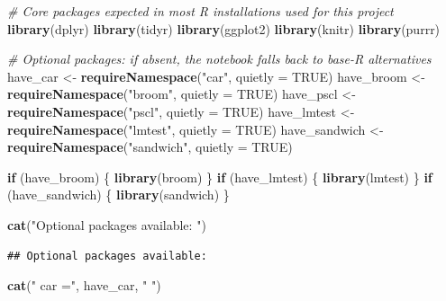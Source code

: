 \documentclass[
]{article}
\newenvironment{Shaded}{\begin{snugshade}}{\end{snugshade}}
\newcommand{\AttributeTok}[1]{\textcolor[rgb]{0.13,0.29,0.53}{#1}}
\newcommand{\CommentTok}[1]{\textcolor[rgb]{0.56,0.35,0.01}{\textit{#1}}}
\newcommand{\ConstantTok}[1]{\textcolor[rgb]{0.56,0.35,0.01}{#1}}
\newcommand{\ControlFlowTok}[1]{\textcolor[rgb]{0.13,0.29,0.53}{\textbf{#1}}}
\newcommand{\FunctionTok}[1]{\textcolor[rgb]{0.13,0.29,0.53}{\textbf{#1}}}
\newcommand{\NormalTok}[1]{#1}
\newcommand{\OtherTok}[1]{\textcolor[rgb]{0.56,0.35,0.01}{#1}}
\newcommand{\StringTok}[1]{\textcolor[rgb]{0.31,0.60,0.02}{#1}}
\begin{document}
\begin{Shaded}
\begin{Highlighting}[]
\CommentTok{\# Core packages expected in most R installations used for this project}
\FunctionTok{library}\NormalTok{(dplyr)}
\FunctionTok{library}\NormalTok{(tidyr)}
\FunctionTok{library}\NormalTok{(ggplot2)}
\FunctionTok{library}\NormalTok{(knitr)}
\FunctionTok{library}\NormalTok{(purrr)}

\CommentTok{\# Optional packages: if absent, the notebook falls back to base{-}R alternatives}
\NormalTok{have\_car      }\OtherTok{\textless{}{-}} \FunctionTok{requireNamespace}\NormalTok{(}\StringTok{"car"}\NormalTok{, }\AttributeTok{quietly =} \ConstantTok{TRUE}\NormalTok{)}
\NormalTok{have\_broom    }\OtherTok{\textless{}{-}} \FunctionTok{requireNamespace}\NormalTok{(}\StringTok{"broom"}\NormalTok{, }\AttributeTok{quietly =} \ConstantTok{TRUE}\NormalTok{)}
\NormalTok{have\_pscl     }\OtherTok{\textless{}{-}} \FunctionTok{requireNamespace}\NormalTok{(}\StringTok{"pscl"}\NormalTok{, }\AttributeTok{quietly =} \ConstantTok{TRUE}\NormalTok{)}
\NormalTok{have\_lmtest   }\OtherTok{\textless{}{-}} \FunctionTok{requireNamespace}\NormalTok{(}\StringTok{"lmtest"}\NormalTok{, }\AttributeTok{quietly =} \ConstantTok{TRUE}\NormalTok{)}
\NormalTok{have\_sandwich }\OtherTok{\textless{}{-}} \FunctionTok{requireNamespace}\NormalTok{(}\StringTok{"sandwich"}\NormalTok{, }\AttributeTok{quietly =} \ConstantTok{TRUE}\NormalTok{)}

\ControlFlowTok{if}\NormalTok{ (have\_broom) \{}
  \FunctionTok{library}\NormalTok{(broom)}
\NormalTok{\}}
\ControlFlowTok{if}\NormalTok{ (have\_lmtest) \{}
  \FunctionTok{library}\NormalTok{(lmtest)}
\NormalTok{\}}
\ControlFlowTok{if}\NormalTok{ (have\_sandwich) \{}
  \FunctionTok{library}\NormalTok{(sandwich)}
\NormalTok{\}}

\FunctionTok{cat}\NormalTok{(}\StringTok{"Optional packages available:}
\StringTok{"}\NormalTok{)}
\end{Highlighting}
\end{Shaded}

\begin{verbatim}
## Optional packages available:
\end{verbatim}

\begin{Shaded}
\begin{Highlighting}[]
\FunctionTok{cat}\NormalTok{(}\StringTok{"  car      ="}\NormalTok{, have\_car, }\StringTok{"}
\StringTok{"}\NormalTok{)}
\end{Highlighting}
\end{Shaded}
\end{document}

